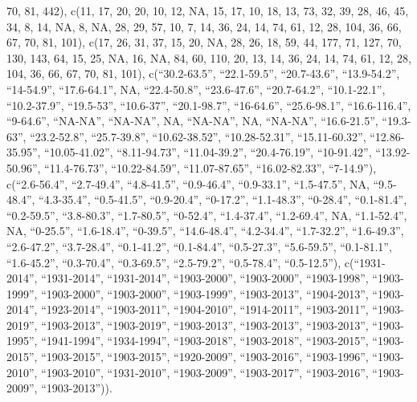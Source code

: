 \documentclass[
]{article}
\begin{document}
70, 81, 442), c(11, 17, 20, 20, 10, 12, NA, 15, 17, 10, 18, 13, 73, 32,
39, 28, 46, 45, 34, 8, 14, NA, 8, NA, 28, 29, 57, 10, 7, 14, 36, 24, 14,
74, 61, 12, 28, 104, 36, 66, 67, 70, 81, 101), c(17, 26, 31, 37, 15, 20,
NA, 28, 26, 18, 59, 44, 177, 71, 127, 70, 130, 143, 64, 15, 25, NA, 16,
NA, 84, 60, 110, 20, 13, 14, 36, 24, 14, 74, 61, 12, 28, 104, 36, 66,
67, 70, 81, 101), c(``30.2-63.5'', ``22.1-59.5'', ``20.7-43.6'',
``13.9-54.2'', ``14-54.9'', ``17.6-64.1'', NA, ``22.4-50.8'',
``23.6-47.6'', ``20.7-64.2'', ``10.1-22.1'', ``10.2-37.9'', ``19.5-53'',
``10.6-37'', ``20.1-98.7'', ``16-64.6'', ``25.6-98.1'', ``16.6-116.4'',
``9-64.6'', ``NA-NA'', ``NA-NA'', NA, ``NA-NA'', NA, ``NA-NA'',
``16.6-21.5'', ``19.3-63'', ``23.2-52.8'', ``25.7-39.8'',
``10.62-38.52'', ``10.28-52.31'', ``15.11-60.32'', ``12.86-35.95'',
``10.05-41.02'', ``8.11-94.73'', ``11.04-39.2'', ``20.4-76.19'',
``10-91.42'', ``13.92-50.96'', ``11.4-76.73'', ``10.22-84.59'',
``11.07-87.65'', ``16.02-82.33'', ``7-14.9''), c(``2.6-56.4'',
``2.7-49.4'', ``4.8-41.5'', ``0.9-46.4'', ``0.9-33.1'', ``1.5-47.5'',
NA, ``9.5-48.4'', ``4.3-35.4'', ``0.5-41.5'', ``0.9-20.4'', ``0-17.2'',
``1.1-48.3'', ``0-28.4'', ``0.1-81.4'', ``0.2-59.5'', ``3.8-80.3'',
``1.7-80.5'', ``0-52.4'', ``1.4-37.4'', ``1.2-69.4'', NA, ``1.1-52.4'',
NA, ``0-25.5'', ``1.6-18.4'', ``0-39.5'', ``14.6-48.4'', ``4.2-34.4'',
``1.7-32.2'', ``1.6-49.3'', ``2.6-47.2'', ``3.7-28.4'', ``0.1-41.2'',
``0.1-84.4'', ``0.5-27.3'', ``5.6-59.5'', ``0.1-81.1'', ``1.6-45.2'',
``0.3-70.4'', ``0.3-69.5'', ``2.5-79.2'', ``0.5-78.4'', ``0.5-12.5''),
c(``1931-2014'', ``1931-2014'', ``1931-2014'', ``1903-2000'',
``1903-2000'', ``1903-1998'', ``1903-1999'', ``1903-2000'',
``1903-2000'', ``1903-1999'', ``1903-2013'', ``1904-2013'',
``1903-2014'', ``1923-2014'', ``1903-2011'', ``1904-2010'',
``1914-2011'', ``1903-2011'', ``1903-2019'', ``1903-2013'',
``1903-2019'', ``1903-2013'', ``1903-2013'', ``1903-2013'',
``1903-1995'', ``1941-1994'', ``1934-1994'', ``1903-2018'',
``1903-2018'', ``1903-2015'', ``1903-2015'', ``1903-2015'',
``1903-2015'', ``1920-2009'', ``1903-2016'', ``1903-1996'',
``1903-2010'', ``1903-2010'', ``1931-2010'', ``1903-2009'',
``1903-2017'', ``1903-2016'', ``1903-2009'', ``1903-2013'')).
\end{document}
